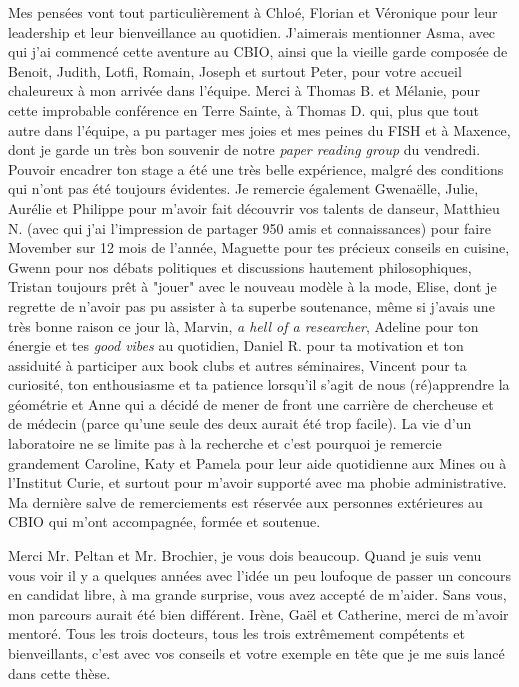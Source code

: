 Mes pensées vont tout particulièrement à Chloé, Florian et Véronique pour leur leadership et leur bienveillance au quotidien.
J'aimerais mentionner Asma, avec qui j'ai commencé cette aventure au CBIO, ainsi que la vieille garde composée de Benoit, Judith, Lotfi, Romain, Joseph et surtout Peter, pour votre accueil chaleureux à mon arrivée dans l'équipe.
Merci à Thomas B. et Mélanie, pour cette improbable conférence en Terre Sainte, à Thomas D. qui, plus que tout autre dans l'équipe, a pu partager mes joies et mes peines du FISH et à Maxence, dont je garde un très bon souvenir de notre \emph{paper reading group} du vendredi.
Pouvoir encadrer ton stage a été une très belle expérience, malgré des conditions qui n'ont pas été toujours évidentes.
Je remercie également Gwenaëlle, Julie, Aurélie et Philippe pour m'avoir fait découvrir vos talents de danseur, Matthieu N. (avec qui j'ai l'impression de partager 950 amis et connaissances) pour faire Movember sur 12 mois de l'année, Maguette pour tes précieux conseils en cuisine, Gwenn pour nos débats politiques et discussions hautement philosophiques, Tristan toujours prêt à "jouer" avec le nouveau modèle à la mode, Elise, dont je regrette de n'avoir pas pu assister à ta superbe soutenance, même si j'avais une très bonne raison ce jour là, Marvin, \emph{a hell of a researcher}, Adeline pour ton énergie et tes \emph{good vibes} au quotidien, Daniel R. pour ta motivation et ton assiduité à participer aux book clubs et autres séminaires, Vincent pour ta curiosité, ton enthousiasme et ta patience lorsqu'il s'agit de nous (ré)apprendre la géométrie et Anne qui a décidé de mener de front une carrière de chercheuse et de médecin (parce qu'une seule des deux aurait été trop facile).
La vie d'un laboratoire ne se limite pas à la recherche et c'est pourquoi je remercie grandement Caroline, Katy et Pamela pour leur aide quotidienne aux Mines ou à l'Institut Curie, et surtout pour m'avoir supporté avec ma phobie administrative.\\

Ma dernière salve de remerciements est réservée aux personnes extérieures au CBIO qui m'ont accompagnée, formée et soutenue.

Merci Mr. Peltan et Mr. Brochier, je vous dois beaucoup.
Quand je suis venu vous voir il y a quelques années avec l'idée un peu loufoque de passer un concours en candidat libre, à ma grande surprise, vous avez accepté de m'aider.
Sans vous, mon parcours aurait été bien différent.
Irène, Gaël et Catherine, merci de m'avoir mentoré.
Tous les trois docteurs, tous les trois extrêmement compétents et bienveillants, c'est avec vos conseils et votre exemple en tête que je me suis lancé dans cette thèse.

